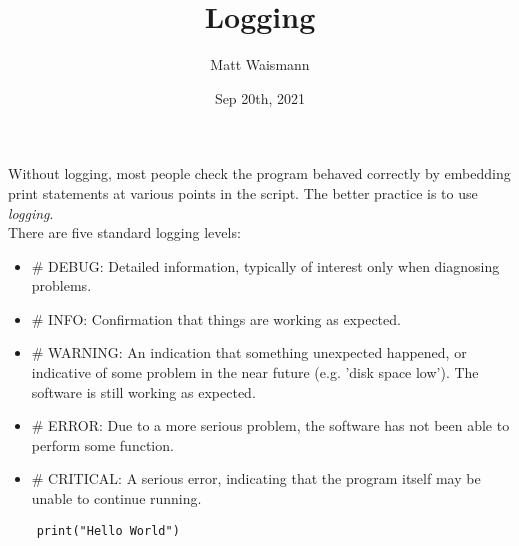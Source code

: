 \documentclass{article}%
\title{Logging}
\date{Sep 20th, 2021}
\author{Matt Waismann}
\begin{document}
\maketitle
Without logging, most people check the program behaved correctly by embedding print statements at various points in the script. The better practice is to use \textit{logging}. \\

There are five standard logging levels:
\begin{itemize}
  \item \# DEBUG: Detailed information, typically of interest only when diagnosing problems.
  \item \# INFO: Confirmation that things are working as expected.
  \item \# WARNING: An indication that something unexpected happened, or indicative of some problem in the near future (e.g. 'disk space low'). The software is still working as expected.
  \item \# ERROR: Due to a more serious problem, the software has not been able to perform some function.
  \item \# CRITICAL: A serious error, indicating that the program itself may be unable to continue running.
\end{itemize}

\begin{lstlisting}
    print("Hello World")
\end{lstlisting}
\end{document}

